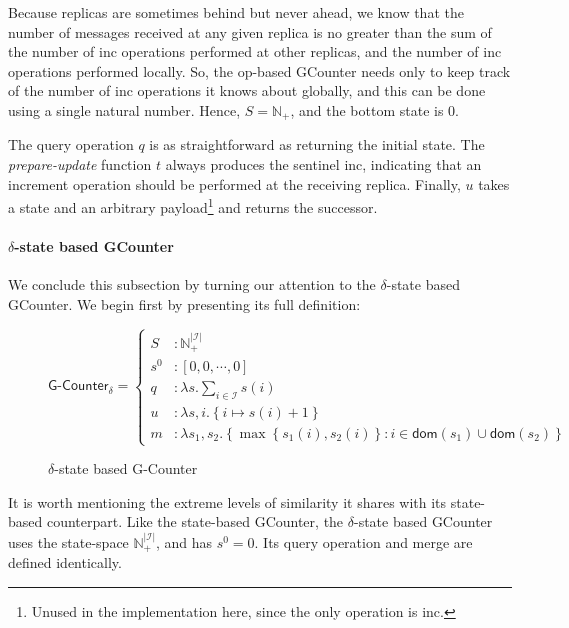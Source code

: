 Because replicas are sometimes behind but never ahead, we know that the number
of messages received at any given replica is no greater than the sum of the
number of \textsf{inc} operations performed at other replicas, and the number of
\textsf{inc} operations performed locally. So, the op-based GCounter needs only
to keep track of the number of \textsf{inc} operations it knows about globally,
and this can be done using a single natural number. Hence, $S = \mathbb{N}_+$,
and the bottom state is $0$.

The query operation $q$ is as straightforward as returning the initial state.
The \emph{prepare-update} function $t$ always produces the sentinel
\textsf{inc}, indicating that an increment operation should be performed at the
receiving replica. Finally, $u$ takes a state and an arbitrary
payload\footnote{Unused in the implementation here, since the only operation is
\textsf{inc}.} and returns the successor.

\paragraph{$\delta$-state based GCounter}
We conclude this subsection by turning our attention to the $\delta$-state based
GCounter. We begin first by presenting its full definition:

\begin{figure}[H]
  \centering
  \[
    \textsf{G-Counter}_\delta = \left\{\begin{aligned}
      S &: \mathbb{N}_+^{|\mathcal{I}|} \\
      s^0 &: \left[ 0, 0, \cdots, 0 \right] \\
      q &: \lambda s. \sum_{i \in \mathcal{I}} s(i) \\
      u &: \lambda s,i. \left\{ i \mapsto s(i) + 1 \right\} \\
      m &: \lambda s_1, s_2. \left\{ \max\left\{ s_1(i), s_2(i) \right\}: i \in \mathsf{dom}(s_1) \cup
      \mathsf{dom}(s_2) \right\}
    \end{aligned}\right.
  \]
  \caption{$\delta$-state based \textsf{G-Counter} \CRDT}
\end{figure}

It is worth mentioning the extreme levels of similarity it shares with its
state-based counterpart. Like the state-based GCounter, the $\delta$-state based
GCounter uses the state-space $\mathbb{N}^{|\mathcal{I}|}_+$, and has $s^0 = 0$.
Its query operation and merge are defined identically.

